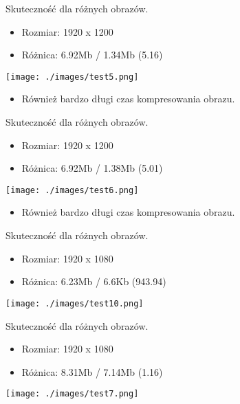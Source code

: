 \documentclass[presentation]{beamer}
\begin{document}
\begin{frame}[label={sec:orgcf90bea}]{Skuteczność dla różnych obrazów.}
\begin{itemize}
\item Rozmiar: 1920 x 1200
\item Różnica: 6.92Mb / 1.34Mb (5.16)
\end{itemize}
\begin{center}
\texttt{[image: ./images/test5.png]}
\end{center}
\begin{itemize}
\item Również bardzo długi czas kompresowania obrazu.
\end{itemize}
\end{frame}

\begin{frame}[label={sec:orgab49a79}]{Skuteczność dla różnych obrazów.}
\begin{itemize}
\item Rozmiar: 1920 x 1200
\item Różnica: 6.92Mb / 1.38Mb (5.01)
\end{itemize}
\begin{center}
\texttt{[image: ./images/test6.png]}
\end{center}
\begin{itemize}
\item Również bardzo długi czas kompresowania obrazu.
\end{itemize}
\end{frame}

\begin{frame}[label={sec:org2fcff28}]{Skuteczność dla różnych obrazów.}
\begin{itemize}
\item Rozmiar: 1920 x 1080
\item Różnica: 6.23Mb / 6.6Kb (943.94)
\end{itemize}
\begin{center}
\texttt{[image: ./images/test10.png]}
\end{center}
\end{frame}

\begin{frame}[label={sec:org8d5f405}]{Skuteczność dla różnych obrazów.}
\begin{itemize}
\item Rozmiar: 1920 x 1080
\item Różnica: 8.31Mb / 7.14Mb (1.16)
\end{itemize}
\begin{center}
\texttt{[image: ./images/test7.png]}
\end{center}
\end{frame}
\end{document}
